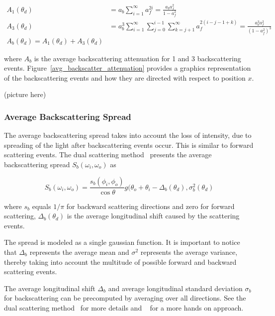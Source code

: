 \begin{align}
A_1(\theta_d) &= a_b \sum_{i=1}^{\infty} a_f^{2i} = \frac{a_b a_f^2}{1 - a_f^2} \\
A_3(\theta_d) &= a_b^3 \sum_{i=1}^{\infty}  \sum_{j=0}^{i-1} \sum_{k=j+1}^{\infty} a_f^{2(i-j-1+k)} = \frac{a_b^3 a_f^2}{(1 - a_f^2)^3} \\
A_b(\theta_d) = A_1(\theta_d) + A_3(\theta_d)
\end{align}

where $A_b$ is the average backscattering attenuation for 1 and 3 backscattering events. Figure~\ref{avg_backscatter_attenuation} provides a graphics representation of the backscattering events and how they are directed with respect to position $x$.

(picture here)

\subsubsection{Average Backscattering Spread}

The average backscattering spread takes into account the loss of intensity, due to spreading of the light after backscattering events occur. This is similar to forward scattering events. The dual scattering method~\cite{zinke} presents the average backscattering spread $S_b(\omega_i, \omega_o)$ as

\begin{equation}
S_b(\omega_i, \omega_o) = \frac{s_b(\phi_i, \phi_o)}{\cos \theta} g(\theta_o + \theta_i - \Delta_b(\theta_d), \sigma_b^2(\theta_d)
\end{equation}

where $s_b$ equals $1/\pi$ for backward scattering directions and zero for forward scattering, $\Delta_b(\theta_d)$ is the average longitudinal shift caused by the scattering events.

The spread is modeled as a single gaussian function. It is important to notice that $\Delta_b$ represents the average mean and $\sigma^2$ represents the average variance, thereby taking into account the multitude of possible forward and backward scattering events.

The average longitudinal shift $\Delta_b$ and average longitudinal standard deviation $\sigma_b$ for backscattering can be precomputed by averaging over all directions. See the dual scattering method~\cite{zinke} for more details and ~\cite{sadeghi} for a more hands on approach.






